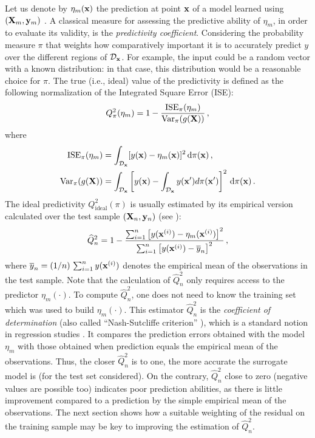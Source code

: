 Let us denote by $\eta_m({\bf x})$ the prediction at point ${\bf x}$ of a model learned using $({\bf X}_m,{\bf y}_m)$ \citep{tibshirani_2009,rasmussen_2006}. 
A classical measure for assessing the predictive ability of $\eta_m$, in order to evaluate its validity, is the \textit{predictivity coefficient}. 
Considering the probability measure $\pi$ that weights how comparatively important it is to accurately predict $y$ over the different regions of $\mathcal{D}_{\bf x}$. 
For example, the input could be a random vector with a known distribution: in that case, this distribution would be a reasonable choice for $\pi$. 
The true (i.e., ideal) value of the predictivity is defined as the following normalization of the Integrated Square Error (ISE): 
\begin{equation}\label{eq:Q2th}
Q_\pi^2(\eta_m) = 1 - \frac{\mathrm{ISE}_\pi(\eta_m)}{\operatorname{Var}_\pi(g({\bf X}))} \,, 
\end{equation}
where
\begin{align*}
  \mathrm{ISE}_\pi(\eta_m) &= \int_{\mathcal{D}_{\bf x}} [y({\bf x})-\eta_m({\bf x})]^2 \, \mathrm{d}\pi({\bf x}) \,, \\
  \operatorname{Var}_\pi(g({\bf X})) &= \int_{\mathcal{D}_{\bf x}} \left[y({\bf x})-\int_{\mathcal{D}_{\bf x}} y({\bf x}') d\pi({\bf x}') \right]^2 \, \mathrm{d}\pi({\bf x})\,.
\end{align*}
The ideal predictivity $Q_{\mathrm{ideal}}^2(\pi)$ is usually estimated by its empirical version calculated over the test sample $({\bf X}_n,{\bf y}_n)$ (see \citealp[p.~32]{daveiga_iooss_2021}): 
\begin{equation}\label{eq:Q2test}
\widehat Q^2_n = 1 - \frac{ \sum_{i=1}^n \left[ y({\bf x}^{(i)})-\eta_m({\bf x}^{(i)})\right]^2}{\sum_{i=1}^n \left[y({\bf x}^{(i)})-\overline{y}_n\right]^2}\,,
\end{equation}
where $\overline{y}_n=(1/n)\,\sum_{i=1}^n y({\bf x}^{(i)})$ denotes the empirical mean of the observations in the test sample. 
Note that the calculation of $\widehat Q^2_n$ only requires access to the predictor $\eta_m(\cdot)$. 
To compute $\widehat Q^2_n$, one does not need to know the training set which was used to build $\eta_m(\cdot)$. 
This estimator $\widehat Q^2_n$ is the \textit{coefficient of determination} (also called ``Nash-Sutcliffe criterion'' \citealp{NashS70}), which is a standard notion in regression studies \citep{klesar00,ioobou10}. 
It compares the prediction errors obtained with the model $\eta_m$ with those obtained when prediction equals the empirical mean of the observations. 
Thus, the closer $\widehat Q^2_n$ is to one, the more accurate the surrogate model is (for the test set considered). 
On the contrary, $\widehat Q^2_n$ close to zero (negative values are possible too) indicates poor prediction abilities, as there is little improvement compared to a prediction by the simple empirical mean of the observations. 
The next section shows how a suitable weighting of the residual on the training sample may be key to improving the estimation of $\widehat Q^2_n$. 


